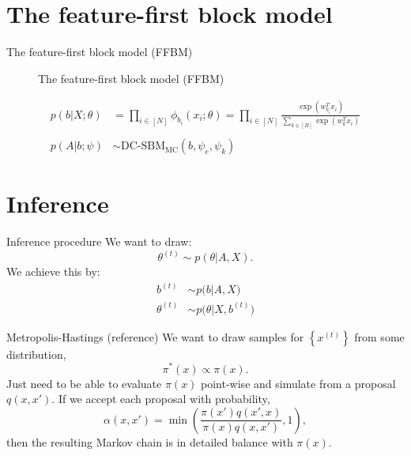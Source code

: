 \documentclass{beamer}
\begin{document}
	\section{The feature-first block model}
	\begin{frame}{The feature-first block model (FFBM)}
		\begin{figure}[!h]
			\centering
			\caption{The feature-first block model (FFBM)}
			\label{fig:ffbm}
		\end{figure}
	
		\begin{align}
			p(b|X; \theta) &= \prod_{i \in [N]} \phi_{b_i} (x_i; \theta)
			= \prod_{i \in [N]} \frac{\exp (w_{b_i}^T x_i)}{\sum_{k \in [B]} \exp (w_k^T x_i) } \\ \nonumber \\
			p(A|b; \psi) &\sim \textrm{DC-SBM}_{\textrm{MC}} (b, \psi_e, \psi_k)
		\end{align}
	\end{frame}

	\section{Inference}
	\begin{frame}{Inference procedure}
		We want to draw:
		\begin{equation}
			\theta^{(t)} \sim p(\theta| A, X).
		\end{equation}
		We achieve this by:
		\begin{align}
			b^{(t)} &\sim p \Big( b| A, X \Big) \\
			\theta^{(t)} &\sim p \Big( \theta| X, b^{(t)} \Big)
		\end{align}
	\end{frame}

	\begin{frame}{Metropolis-Hastings (reference) \cite{hastings-alg}}
		We want to draw samples for $\left\{ x^{(t)} \right\}$ from some distribution,
		\begin{equation}
			\pi^*(x) \propto \pi(x).
		\end{equation}
		Just need to be able to evaluate $\pi(x)$ point-wise and simulate from a proposal $q(x, x')$. If we accept each proposal with probability,
		\begin{equation}
			\alpha(x, x') = \min \left( \frac{\pi(x') q(x', x)}{\pi(x) q(x, x')} , 1 \right),
			\label{eqn:mh-accept}
		\end{equation}
		then the resulting Markov chain is in detailed balance with $\pi(x)$.
	\end{frame}
	
\end{document}
